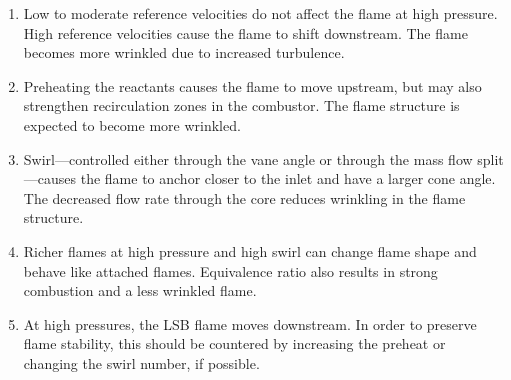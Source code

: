 \begin{enumerate}
  \item Low to moderate reference velocities do not affect the flame at high pressure.
    High reference velocities cause the flame to shift downstream.
    The flame becomes more wrinkled due to increased turbulence.
  \item Preheating the reactants causes the flame to move upstream, but may also strengthen recirculation zones in the combustor.
    The flame structure is expected to become more wrinkled.
  \item Swirl---controlled either through the vane angle or through the mass flow split---causes the flame to anchor closer to the inlet and have a larger cone angle.
    The decreased flow rate through the core reduces wrinkling in the flame structure.
  \item Richer flames at high pressure and high swirl can change flame shape and behave like attached flames.
    Equivalence ratio also results in strong combustion and a less wrinkled flame.
  \item At high pressures, the LSB flame moves downstream.
    In order to preserve flame stability, this should be countered by increasing the preheat or changing the swirl number, if possible.
\end{enumerate}

